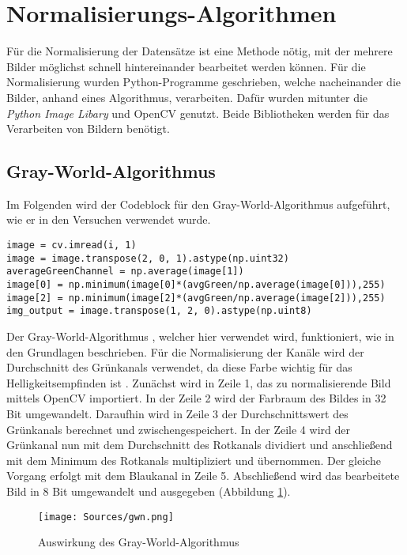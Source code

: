 \section{Normalisierungs-Algorithmen}\label{s.nalgorithmen}
Für die Normalisierung der Datensätze ist eine Methode nötig, mit der mehrere Bilder möglichst schnell hintereinander bearbeitet werden können. Für die Normalisierung wurden Python-Programme geschrieben, welche nacheinander die Bilder, anhand eines Algorithmus, verarbeiten. Dafür wurden mitunter die \textit{Python Image Libary} und OpenCV genutzt. Beide Bibliotheken werden für das Verarbeiten von Bildern benötigt. 
\newpage
\subsection{Gray-World-Algorithmus} 
Im Folgenden wird der Codeblock für den Gray-World-Algorithmus aufgeführt, wie er in den Versuchen verwendet wurde.\\
\begin{lstlisting}
image = cv.imread(i, 1)
image = image.transpose(2, 0, 1).astype(np.uint32)
averageGreenChannel = np.average(image[1])
image[0] = np.minimum(image[0]*(avgGreen/np.average(image[0])),255)
image[2] = np.minimum(image[2]*(avgGreen/np.average(image[2])),255)
img_output = image.transpose(1, 2, 0).astype(np.uint8)
\end{lstlisting}
Der Gray-World-Algorithmus \cite{gray2012world}, welcher hier verwendet wird, funktioniert, wie in den Grundlagen beschrieben. Für die Normalisierung der Kanäle wird der Durchschnitt des Grünkanals verwendet, da diese Farbe wichtig für das Helligkeitsempfinden ist \cite{farbmodell2019uni}. Zunächst wird in Zeile 1, das zu normalisierende Bild mittels OpenCV importiert. In der Zeile 2 wird der Farbraum des Bildes in 32 Bit umgewandelt. Daraufhin wird in Zeile 3 der Durchschnittswert des Grünkanals berechnet und zwischengespeichert. In der Zeile 4 wird der Grünkanal nun mit dem Durchschnitt des Rotkanals dividiert und anschließend mit dem Minimum des Rotkanals multipliziert und übernommen. Der gleiche Vorgang erfolgt mit dem Blaukanal in Zeile 5. Abschließend wird das bearbeitete Bild in 8 Bit umgewandelt und ausgegeben (Abbildung \ref{img:gwnimg}). 
\begin{figure}
	[h]
	\centering
	\texttt{[image: Sources/gwn.png]}
	\caption{Auswirkung des Gray-World-Algorithmus}
	\label{img:gwnimg}
\end{figure}
\newpage
